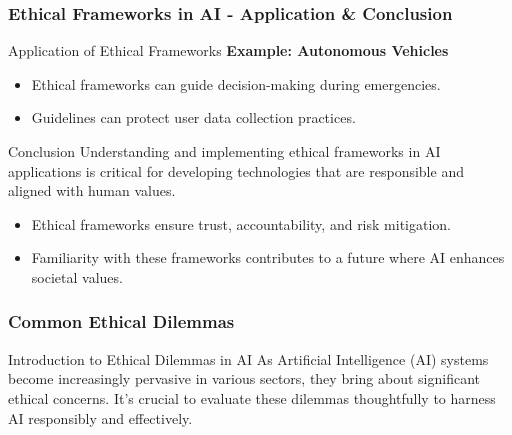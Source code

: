 \documentclass[aspectratio=169]{beamer}
\begin{document}
\begin{frame}[fragile]
    \frametitle{Ethical Frameworks in AI - Application & Conclusion}
    \begin{block}{Application of Ethical Frameworks}
        \textbf{Example: Autonomous Vehicles}
        \begin{itemize}
            \item Ethical frameworks can guide decision-making during emergencies.
            \item Guidelines can protect user data collection practices.
        \end{itemize}
    \end{block}

    \begin{block}{Conclusion}
        Understanding and implementing ethical frameworks in AI applications is critical for developing technologies that are responsible and aligned with human values. 
        \begin{itemize}
            \item Ethical frameworks ensure trust, accountability, and risk mitigation.
            \item Familiarity with these frameworks contributes to a future where AI enhances societal values.
        \end{itemize}
    \end{block}
\end{frame}

\begin{frame}[fragile]
    \frametitle{Common Ethical Dilemmas}
    
    \begin{block}{Introduction to Ethical Dilemmas in AI}
        As Artificial Intelligence (AI) systems become increasingly pervasive in various sectors, they bring about significant ethical concerns. 
        It’s crucial to evaluate these dilemmas thoughtfully to harness AI responsibly and effectively.
    \end{block}
\end{frame}
\end{document}

